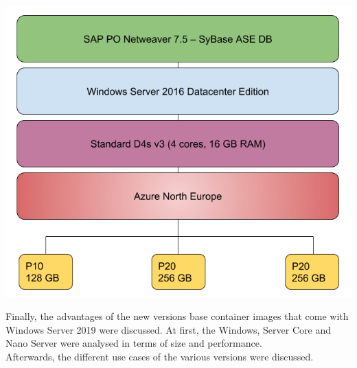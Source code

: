 \documentclass[a0,portrait]{a0poster}
\begin{document}
\begin{multicols}{2}
\begin{center}\vspace{1cm}
    \includegraphics[width=1.0\linewidth]{../bachproef/img/Methodologie/SAP_PO}
\end{center}\vspace{1cm}

\vfill\null
\columnbreak

Finally, the advantages of the new versions base container images that come with Windows Server 2019 were discussed.
At first, the Windows, Server Core and Nano Server were analysed in terms of size and performance. \\
Afterwards, the different use cases of the various versions were discussed.


\end{multicols}
\end{document}
